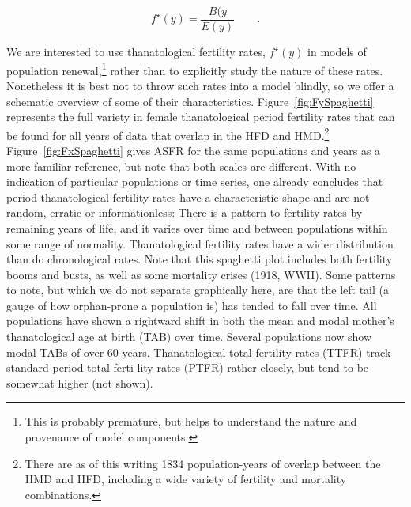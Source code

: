 \documentclass{article}
\newcommand{\ep}{\quad\quad\text{.}}
\begin{document}
\begin{equation}
f^\star(y) = \frac{B(y}{E(y)} \ep
\end{equation}

We are interested to use thanatological fertility rates, $f^\star(y)$ in
models of population renewal,\footnote{This is probably premature, but helps to
understand the nature and provenance of model components.} rather than to
explicitly study the nature of these rates. Nonetheless it is best not to throw such rates into a model blindly, so we offer a schematic overview of some of their characteristics.
Figure~\ref{fig:FySpaghetti} represents the full variety in
female thanatological period fertility rates that can be found for all years
of data that overlap in the HFD and HMD.\footnote{There are as of this writing
1834 population-years of overlap between the HMD and HFD, including a wide
variety of fertility and mortality combinations.} Figure~\ref{fig:FxSpaghetti} gives ASFR for the same
populations and years as a more familiar reference, but note that both scales
are different. With no indication of particular populations or time series, one
already concludes that period thanatological fertility rates have a
characteristic shape and are not random, erratic or informationless: There is a
pattern to fertility rates by remaining years of life, and it varies over time
and between populations within some range of normality. Thanatological fertility
rates have a wider distribution than do chronological rates. Note that this
spaghetti plot includes both fertility booms and busts, as well as some
mortality crises (1918, WWII). Some patterns to note, but which we do not
separate graphically here, are that the left tail (a gauge of how orphan-prone a
population is) has tended to fall over time. All populations have shown a
rightward shift in both the mean and modal mother's thanatological age at birth
(TAB) over time. Several
populations now show modal TABs of over 60 years. Thanatological total fertility rates (TTFR)
track standard period total ferti
lity rates (PTFR) rather closely, but tend to
be somewhat higher (not shown).
\end{document}
